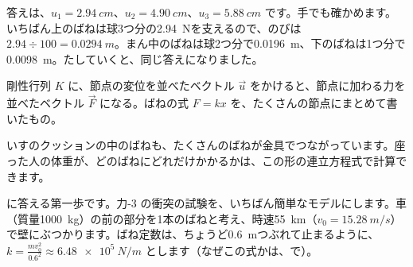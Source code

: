 \noindent 答えは、$u_1=\qty{2.94}{cm}$、$u_2=\qty{4.90}{cm}$、$u_3=\qty{5.88}{cm}$ です。手でも確かめます。いちばん上のばねは球3つ分の\qty{2.94}{N}を支えるので、のびは $2.94\div100=\qty{0.0294}{m}$。まん中のばねは球2つ分で\qty{0.0196}{m}、下のばねは1つ分で\qty{0.0098}{m}。たしていくと、同じ答えになりました。
\begin{phyomi}[$K\vec u=\vec F$]
剛性行列 $K$ に、節点の変位を並べたベクトル $\vec u$ をかけると、節点に加わる力を並べたベクトル $\vec F$ になる。ばねの式 $F=kx$ を、たくさんの節点にまとめて書いたもの。
\end{phyomi}
\begin{phmijika}[いすのクッション]
いすのクッションの中のばねも、たくさんのばねが金具でつながっています。座った人の体重が、どのばねにどれだけかかるかは、この形の連立方程式で計算できます。
\end{phmijika}

\leavevmode\label{ph:力-16:sec3}\bkhatenaref に答える第一歩です。力-3 の衝突の試験を、いちばん簡単なモデルにします。車（質量\qty{1000}{kg}）の前の部分を1本のばねと考え、時速\qty{55}{km}（$v_0=\qty{15.28}{m/s}$）で壁にぶつかります。ばね定数は、ちょうど\qty{0.6}{m}つぶれて止まるように、$k=\tfrac{mv_0^2}{0.6^2}\approx\qty{6.48e5}{N/m}$ とします（なぜこの式かは、で）。

